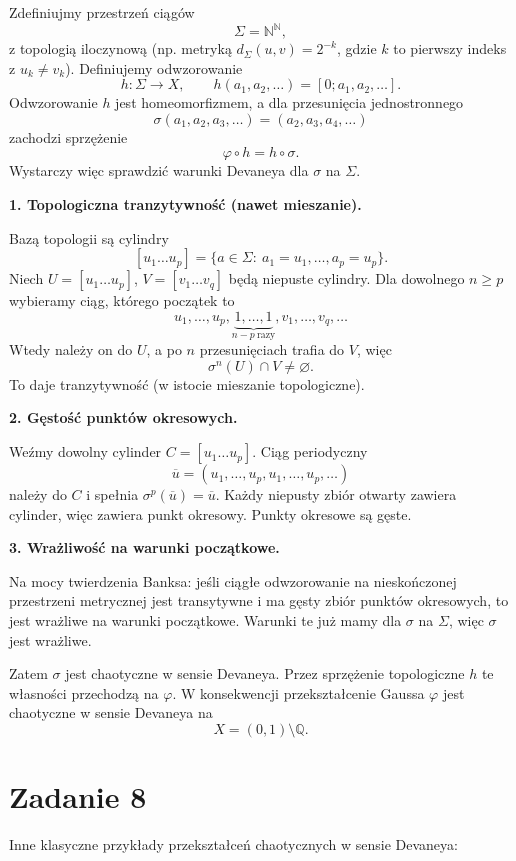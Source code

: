 \documentclass[11pt,a4paper]{article}
\newcommand{\N}{\mathbb{N}}
\newcommand{\Q}{\mathbb{Q}}
\theoremstyle{plain}
\theoremstyle{definition}
\begin{document}
Zdefiniujmy przestrzeń ciągów
\[
\Sigma=\N^{\N},
\]
z topologią iloczynową (np. metryką
$d_\Sigma(u,v)=2^{-k}$, gdzie $k$ to pierwszy indeks z $u_k\neq v_k$).
Definiujemy odwzorowanie
\[
h:\Sigma\to X,
\qquad
h(a_1,a_2,\dots)=[0;a_1,a_2,\dots].
\]
Odwzorowanie $h$ jest homeomorfizmem, a dla przesunięcia jednostronnego
\[
\sigma(a_1,a_2,a_3,\dots)=(a_2,a_3,a_4,\dots)
\]
zachodzi sprzężenie
\[
\varphi\circ h=h\circ\sigma.
\]
Wystarczy więc sprawdzić warunki Devaneya dla $\sigma$ na $\Sigma$.

\textbf{1. Topologiczna tranzytywność (nawet mieszanie).}

Bazą topologii są cylindry
\[
[u_1\dots u_p]=\{a\in\Sigma:\ a_1=u_1,\dots,a_p=u_p\}.
\]
Niech $U=[u_1\dots u_p]$, $V=[v_1\dots v_q]$ będą niepuste cylindry. Dla dowolnego $n\ge p$ wybieramy ciąg, którego początek to
\[
u_1,\dots,u_p,\underbrace{1,\dots,1}_{n-p\ \text{razy}},v_1,\dots,v_q,\dots
\]
Wtedy należy on do $U$, a po $n$ przesunięciach trafia do $V$, więc
\[
\sigma^n(U)\cap V\neq\varnothing.
\]
To daje tranzytywność (w istocie mieszanie topologiczne).

\textbf{2. Gęstość punktów okresowych.}

Weźmy dowolny cylinder $C=[u_1\dots u_p]$. Ciąg periodyczny
\[
\overline{u}=(u_1,\dots,u_p,u_1,\dots,u_p,\dots)
\]
należy do $C$ i spełnia $\sigma^p(\overline{u})=\overline{u}$. Każdy niepusty zbiór otwarty zawiera cylinder, więc zawiera punkt okresowy. Punkty okresowe są gęste.

\textbf{3. Wrażliwość na warunki początkowe.}

Na mocy twierdzenia Banksa: jeśli ciągłe odwzorowanie na nieskończonej przestrzeni metrycznej jest transytywne i ma gęsty zbiór punktów okresowych, to jest wrażliwe na warunki początkowe.
Warunki te już mamy dla $\sigma$ na $\Sigma$, więc $\sigma$ jest wrażliwe.

Zatem $\sigma$ jest chaotyczne w sensie Devaneya. Przez sprzężenie topologiczne $h$ te własności przechodzą na $\varphi$.
W konsekwencji przekształcenie Gaussa $\varphi$ jest chaotyczne w sensie Devaneya na
\[
X=(0,1)\setminus\Q.
\]

\section{Zadanie 8}

Inne klasyczne przykłady przekształceń chaotycznych w sensie Devaneya:
\end{document}
